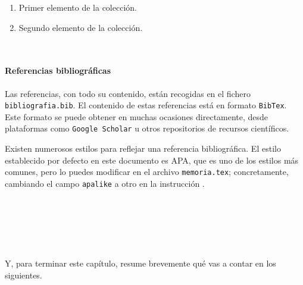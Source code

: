 \begin{enumerate}
 \item Primer elemento de la colección.
 \item Segundo elemento de la colección.
\end{enumerate}\

\paragraph{Referencias bibliográficas}
\label{sec:referencias}


Las referencias, con todo su contenido, están recogidas en el fichero \texttt{bibliografia.bib}. El contenido de estas referencias está en formato \texttt{BibTex}. Este formato se puede obtener en muchas ocasiones directamente, desde plataformas como \texttt{Google Scholar} u otros repositorios de recursos científicos.

Existen numerosos estilos para reflejar una referencia bibliográfica. El estilo establecido por defecto en este documento es APA, que es uno de los estilos más comunes, pero lo puedes modificar en el archivo \texttt{memoria.tex}; concretamente, cambiando el campo \verb|apalike| a otro en la instrucción \verb||. 

\

\

\

Y, para terminar este capítulo, resume brevemente qué vas a contar en los siguientes.
